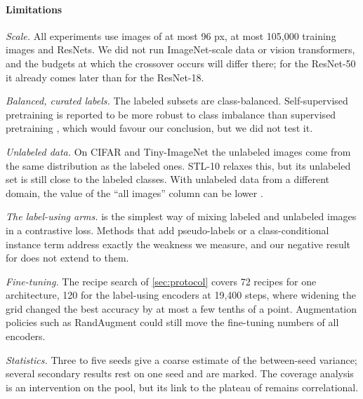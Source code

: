 \paragraph{Limitations}
\emph{Scale.} All experiments use images of at most 96 px, at most 105,000 training images and ResNets. We
did not run ImageNet-scale data or vision transformers, and the budgets at which the crossover occurs will
differ there; for the ResNet-50 it already comes later than for the ResNet-18.

\emph{Balanced, curated labels.} The labeled subsets are class-balanced. Self-supervised pretraining is
reported to be more robust to class imbalance than supervised pretraining
\citep{liu2022self,yang2020rethinking}, which would favour our conclusion, but we did not test it.

\emph{Unlabeled data.} On CIFAR and Tiny-ImageNet the unlabeled images come from the same distribution as the
labeled ones.
STL-10 relaxes this, but its unlabeled set is still close to the labeled classes. With unlabeled data from
a different domain, the value of the ``all images'' column can be lower \citep{cole2022when}.

\emph{The label-using arms.} \union is the simplest way of mixing labeled and unlabeled images in a
contrastive loss. Methods that add pseudo-labels or a class-conditional instance term
\citep{li2021comatch,zheng2022simmatch,chen2022perfectly} address exactly the weakness we measure, and our
negative result for \union does not extend to them.

\emph{Fine-tuning.} The recipe search of \cref{sec:protocol} covers 72 recipes for one architecture, 120 for
the label-using encoders at 19,400 steps, where widening the grid changed the best accuracy by at most a few
tenths of a point. Augmentation policies such as RandAugment \citep{cubuk2020randaugment} could still move the
fine-tuning numbers of all encoders.

\emph{Statistics.} Three to five seeds give a coarse estimate of the between-seed variance; several
secondary results rest on one seed and are marked. The coverage analysis is an intervention on the pool,
but its link to the plateau of \supcon remains correlational.

